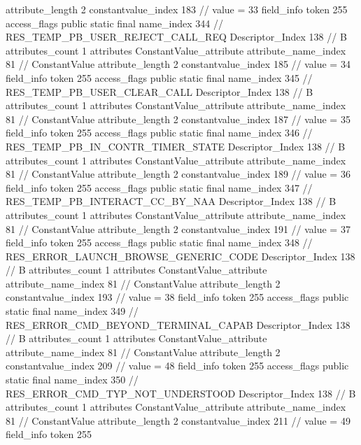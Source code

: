 {{{{{{{					attribute_length	2
					constantvalue_index	183		// value = 33
				}
				}
			}
			field_info {
				token	255
				access_flags	public static final
				name_index	344		// RES_TEMP_PB_USER_REJECT_CALL_REQ
				Descriptor_Index	138		// B
				attributes_count	1
				attributes {
				ConstantValue_attribute {
					attribute_name_index	81		// ConstantValue
					attribute_length	2
					constantvalue_index	185		// value = 34
				}
				}
			}
			field_info {
				token	255
				access_flags	public static final
				name_index	345		// RES_TEMP_PB_USER_CLEAR_CALL
				Descriptor_Index	138		// B
				attributes_count	1
				attributes {
				ConstantValue_attribute {
					attribute_name_index	81		// ConstantValue
					attribute_length	2
					constantvalue_index	187		// value = 35
				}
				}
			}
			field_info {
				token	255
				access_flags	public static final
				name_index	346		// RES_TEMP_PB_IN_CONTR_TIMER_STATE
				Descriptor_Index	138		// B
				attributes_count	1
				attributes {
				ConstantValue_attribute {
					attribute_name_index	81		// ConstantValue
					attribute_length	2
					constantvalue_index	189		// value = 36
				}
				}
			}
			field_info {
				token	255
				access_flags	public static final
				name_index	347		// RES_TEMP_PB_INTERACT_CC_BY_NAA
				Descriptor_Index	138		// B
				attributes_count	1
				attributes {
				ConstantValue_attribute {
					attribute_name_index	81		// ConstantValue
					attribute_length	2
					constantvalue_index	191		// value = 37
				}
				}
			}
			field_info {
				token	255
				access_flags	public static final
				name_index	348		// RES_ERROR_LAUNCH_BROWSE_GENERIC_CODE
				Descriptor_Index	138		// B
				attributes_count	1
				attributes {
				ConstantValue_attribute {
					attribute_name_index	81		// ConstantValue
					attribute_length	2
					constantvalue_index	193		// value = 38
				}
				}
			}
			field_info {
				token	255
				access_flags	public static final
				name_index	349		// RES_ERROR_CMD_BEYOND_TERMINAL_CAPAB
				Descriptor_Index	138		// B
				attributes_count	1
				attributes {
				ConstantValue_attribute {
					attribute_name_index	81		// ConstantValue
					attribute_length	2
					constantvalue_index	209		// value = 48
				}
				}
			}
			field_info {
				token	255
				access_flags	public static final
				name_index	350		// RES_ERROR_CMD_TYP_NOT_UNDERSTOOD
				Descriptor_Index	138		// B
				attributes_count	1
				attributes {
				ConstantValue_attribute {
					attribute_name_index	81		// ConstantValue
					attribute_length	2
					constantvalue_index	211		// value = 49
				}
				}
			}
			field_info {
				token	255
}}}}}

